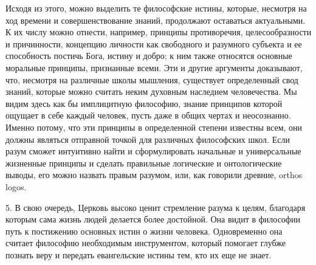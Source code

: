 \documentclass[a5paper,10pt]{article}
\begin{document}
Исходя из этого, можно выделить те философские истины, которые, несмотря на ход
времени и совершенствование знаний, продолжают оставаться актуальными. К их
числу можно отнести, например, принципы противоречия, целесообразности и
причинности, концепцию личности как свободного и разумного субъекта и ее
способность постичь Бога, истину и добро; к ним также относятся основные
моральные принципы, признанные всеми. Эти и другие аргументы доказывают, что,
несмотря на различные школы мышления, существует определенный свод знаний,
которые можно считать неким духовным наследием человечества. Мы видим здесь как
бы имплицитную философию, знание принципов которой ощущает в себе каждый
человек, пусть даже в общих чертах и неосознанно. Именно потому, что эти
принципы в определенной степени известны всем, они должны являться отправной
точкой для различных философских школ. Если разум сможет интуитивно найти и
сформулировать начальные и универсальные жизненные принципы и сделать
правильные логические и онтологические выводы, его можно назвать правым
разумом, или, как говорили древние, orthos logos.

5. В свою очередь, Церковь высоко ценит стремление разума к целям, благодаря
которым сама жизнь людей делается более достойной. Она видит в философии путь к
постижению основных истин о жизни человека. Одновременно она считает философию
необходимым инструментом, который помогает глубже познать веру и передать
евангельские истины тем, кто их еще не знает.
\end{document}

